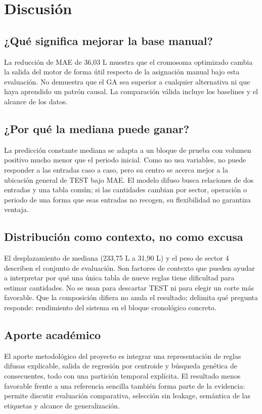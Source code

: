 \documentclass[11pt,letterpaper]{article}
\begin{document}
\section{Discusión}
\subsection{¿Qué significa mejorar la base manual?}
La reducción de MAE de 36,03 L muestra que el cromosoma optimizado cambia la salida del motor de forma útil respecto de la asignación manual bajo esta evaluación. No demuestra que el GA sea superior a cualquier alternativa ni que haya aprendido un patrón causal. La comparación válida incluye los baselines y el alcance de los datos.

\subsection{¿Por qué la mediana puede ganar?}
La predicción constante mediana se adapta a un bloque de prueba con volumen positivo mucho menor que el periodo inicial. Como no usa variables, no puede responder a las entradas caso a caso, pero su centro se acerca mejor a la ubicación general de TEST bajo MAE. El modelo difuso busca relaciones de dos entradas y una tabla común; si las cantidades cambian por sector, operación o periodo de una forma que esas entradas no recogen, su flexibilidad no garantiza ventaja.

\subsection{Distribución como contexto, no como excusa}
El desplazamiento de mediana (233,75 L a 31,90 L) y el peso de sector 4 describen el conjunto de evaluación. Son factores de contexto que pueden ayudar a interpretar por qué una única tabla de nueve reglas tiene dificultad para estimar cantidades. No se usan para descartar TEST ni para elegir un corte más favorable. Que la composición difiera no anula el resultado; delimita qué pregunta responde: rendimiento del sistema en el bloque cronológico concreto.

\subsection{Aporte académico}
El aporte metodológico del proyecto es integrar una representación de reglas difusas explicable, salida de regresión por centroide y búsqueda genética de consecuentes, todo con una partición temporal explícita. El resultado menos favorable frente a una referencia sencilla también forma parte de la evidencia: permite discutir evaluación comparativa, selección sin leakage, semántica de las etiquetas y alcance de generalización.
\end{document}
